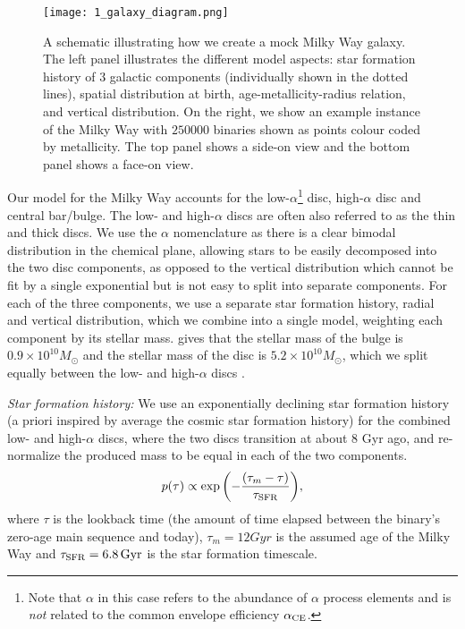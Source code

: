 \begin{figure*}[t]
    \centering
    \texttt{[image: 1\_galaxy\_diagram.png]}
    \caption{A schematic illustrating how we create a mock Milky Way galaxy. The left panel illustrates the different model aspects: star formation history of 3 galactic components (individually shown in the dotted lines), spatial distribution at birth, age-metallicity-radius relation, and vertical distribution.
    On the right, we show an example instance of the Milky Way with $250000$ binaries shown as points colour coded by metallicity. The top panel shows a side-on view and the bottom panel shows a face-on view.}
    \label{fig:galaxy_schematic}
\end{figure*}

Our model for the Milky Way accounts for the low-$\alpha$\footnote{Note that $\alpha$ in this case refers to the abundance of $\alpha$ process elements and is \textit{not} related to the common envelope efficiency $\alpha_{\rm CE}$.} disc, high-$\alpha$ disc and central bar/bulge. The low- and high-$\alpha$ discs are often also referred to as the thin and thick discs. We use the $\alpha$ nomenclature as there is a clear bimodal distribution in the chemical plane, allowing stars to be easily decomposed into the two disc components, as opposed to the vertical distribution which cannot be fit by a single exponential but is not easy to split into separate components. For each of the three components, we use a separate star formation history, radial and vertical distribution, which we combine into a single model, weighting each component by its stellar mass. \citet{Licquia+2015} gives that the stellar mass of the bulge is $0.9 \times 10^{10} \unit{M_{\odot}}$ and the stellar mass of the disc is $5.2 \times 10^{10} \unit{M_\odot}$, which we split equally between the low- and high-$\alpha$ discs \citep[e.g.,][]{Snaith+2014}.

\textit{Star formation history:} 
We use an exponentially declining star formation history \citep{Frankel+2018} (a priori inspired by average the cosmic star formation history) for the combined low- and high-$\alpha$ discs, where the two discs transition at about 8 Gyr ago, and re-normalize the produced mass to be equal in each of the two components.
\begin{equation}\label{eq:thin_disc_tau}
    p(\tau) \propto \exp \qty(-\frac{(\tau_m - \tau)}{\tau_{\rm SFR}}),
\end{equation}
where $\tau$ is the lookback time (the amount of time elapsed between the binary's zero-age main sequence and today), $\tau_m = 12 \unit{Gyr}$ is the assumed age of the Milky Way and $\tau_{\rm SFR} = 6.8 \unit{Gyr}$ is the star formation timescale. 

